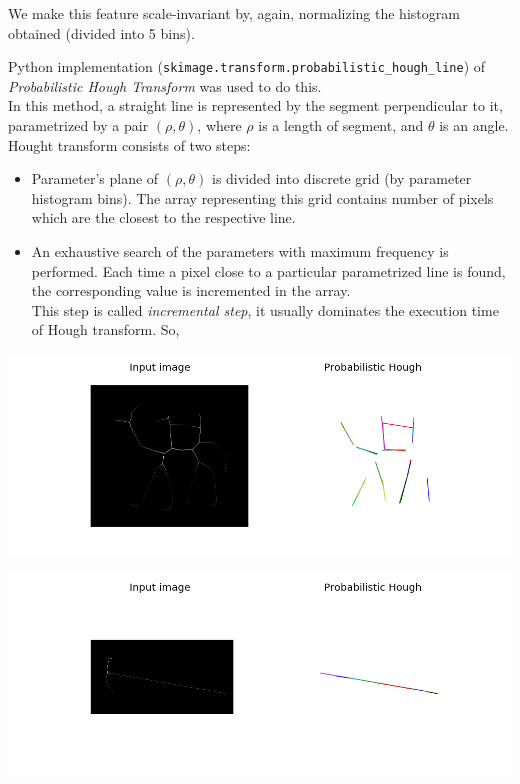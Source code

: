 \documentclass[12pt]{article}
\begin{document}
We make this feature scale-invariant by, again, normalizing the histogram obtained (divided into 5 bins).

Python implementation (\texttt{skimage.transform.probabilistic\_hough\_line}) of \textit{Probabilistic Hough Transform} \cite{Kiryati} was used to do this. \\
In this method, a straight line is represented by the segment perpendicular to it, parametrized by a pair $(\rho, \theta)$, where $\rho$ is a length of segment, and $\theta$ is an angle. \\
Hought transform consists of two steps: 
\begin{itemize}
  \item Parameter's plane of $(\rho, \theta)$ is divided into discrete grid (by parameter histogram bins). The array representing this grid contains number of pixels which are the closest to the respective line.
  \item An exhaustive search of the parameters with maximum frequency is performed. Each time a pixel close to a particular parametrized line is found, the corresponding value is incremented in the array.\\
  This step is called \textit{incremental step}, it usually dominates the execution time of Hough transform. So, %
\end{itemize}

\includegraphics[scale=0.6]{camel_764.png}
\vspace{12px}

\includegraphics[scale=0.6]{hammer_604.png}
\end{document}
